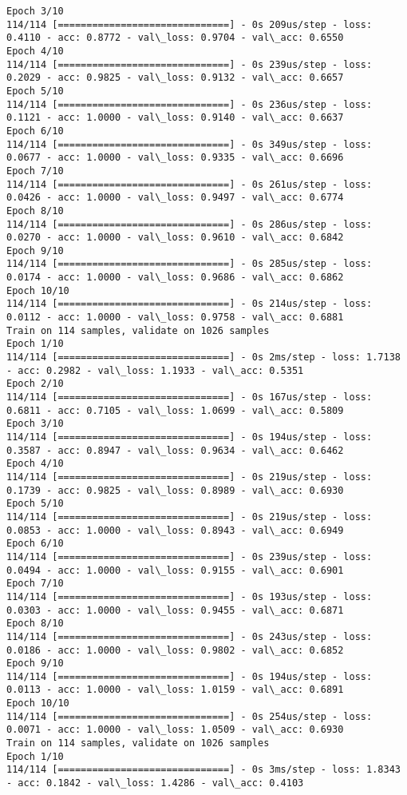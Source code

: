 \documentclass[11pt]{article}
\begin{document}
\begin{Verbatim}[commandchars=\\\{\}]
Epoch 3/10
114/114 [==============================] - 0s 209us/step - loss: 0.4110 - acc: 0.8772 - val\_loss: 0.9704 - val\_acc: 0.6550
Epoch 4/10
114/114 [==============================] - 0s 239us/step - loss: 0.2029 - acc: 0.9825 - val\_loss: 0.9132 - val\_acc: 0.6657
Epoch 5/10
114/114 [==============================] - 0s 236us/step - loss: 0.1121 - acc: 1.0000 - val\_loss: 0.9140 - val\_acc: 0.6637
Epoch 6/10
114/114 [==============================] - 0s 349us/step - loss: 0.0677 - acc: 1.0000 - val\_loss: 0.9335 - val\_acc: 0.6696
Epoch 7/10
114/114 [==============================] - 0s 261us/step - loss: 0.0426 - acc: 1.0000 - val\_loss: 0.9497 - val\_acc: 0.6774
Epoch 8/10
114/114 [==============================] - 0s 286us/step - loss: 0.0270 - acc: 1.0000 - val\_loss: 0.9610 - val\_acc: 0.6842
Epoch 9/10
114/114 [==============================] - 0s 285us/step - loss: 0.0174 - acc: 1.0000 - val\_loss: 0.9686 - val\_acc: 0.6862
Epoch 10/10
114/114 [==============================] - 0s 214us/step - loss: 0.0112 - acc: 1.0000 - val\_loss: 0.9758 - val\_acc: 0.6881
Train on 114 samples, validate on 1026 samples
Epoch 1/10
114/114 [==============================] - 0s 2ms/step - loss: 1.7138 - acc: 0.2982 - val\_loss: 1.1933 - val\_acc: 0.5351
Epoch 2/10
114/114 [==============================] - 0s 167us/step - loss: 0.6811 - acc: 0.7105 - val\_loss: 1.0699 - val\_acc: 0.5809
Epoch 3/10
114/114 [==============================] - 0s 194us/step - loss: 0.3587 - acc: 0.8947 - val\_loss: 0.9634 - val\_acc: 0.6462
Epoch 4/10
114/114 [==============================] - 0s 219us/step - loss: 0.1739 - acc: 0.9825 - val\_loss: 0.8989 - val\_acc: 0.6930
Epoch 5/10
114/114 [==============================] - 0s 219us/step - loss: 0.0853 - acc: 1.0000 - val\_loss: 0.8943 - val\_acc: 0.6949
Epoch 6/10
114/114 [==============================] - 0s 239us/step - loss: 0.0494 - acc: 1.0000 - val\_loss: 0.9155 - val\_acc: 0.6901
Epoch 7/10
114/114 [==============================] - 0s 193us/step - loss: 0.0303 - acc: 1.0000 - val\_loss: 0.9455 - val\_acc: 0.6871
Epoch 8/10
114/114 [==============================] - 0s 243us/step - loss: 0.0186 - acc: 1.0000 - val\_loss: 0.9802 - val\_acc: 0.6852
Epoch 9/10
114/114 [==============================] - 0s 194us/step - loss: 0.0113 - acc: 1.0000 - val\_loss: 1.0159 - val\_acc: 0.6891
Epoch 10/10
114/114 [==============================] - 0s 254us/step - loss: 0.0071 - acc: 1.0000 - val\_loss: 1.0509 - val\_acc: 0.6930
Train on 114 samples, validate on 1026 samples
Epoch 1/10
114/114 [==============================] - 0s 3ms/step - loss: 1.8343 - acc: 0.1842 - val\_loss: 1.4286 - val\_acc: 0.4103

\end{Verbatim}
\end{document}
